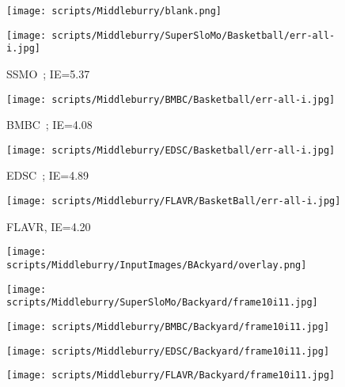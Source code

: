 \documentclass[10pt,twocolumn,letterpaper]{article}
\begin{document}
\begin{table*}[!t]
\begin{figure*}[t]
\begin{center}
     \begin{subfigure}[b]{0.18\textwidth}
        \centering
        \texttt{[image: scripts/Middleburry/blank.png]}
    \end{subfigure}
    \hfill
    \begin{subfigure}[b]{0.18\textwidth}
        \centering
        \texttt{[image: scripts/Middleburry/SuperSloMo/Basketball/err-all-i.jpg]}
        \caption*{SSMO~\cite{jiang2018super}; IE=5.37}
    \end{subfigure}
    \hfill
    \begin{subfigure}[b]{0.18\textwidth}
        \centering
        \texttt{[image: scripts/Middleburry/BMBC/Basketball/err-all-i.jpg]}
        \caption*{BMBC~\cite{park2020bmbc}; IE=4.08}
    \end{subfigure}
    \hfill
    \begin{subfigure}[b]{0.18\textwidth}
        \centering
        \texttt{[image: scripts/Middleburry/EDSC/Basketball/err-all-i.jpg]}
        \caption*{EDSC~\cite{cheng2020multiple}; IE=4.89}
    \end{subfigure}
    \hfill
    \begin{subfigure}[b]{0.18\textwidth}
        \centering
\texttt{[image: scripts/Middleburry/FLAVR/BasketBall/err-all-i.jpg]}
        \caption*{FLAVR, IE=4.20}
    \end{subfigure}
    


    \vspace{1em}
    \begin{subfigure}[b]{0.18\textwidth}
        \centering
        \texttt{[image: scripts/Middleburry/InputImages/BAckyard/overlay.png]}
    \end{subfigure}
    \hfill
    \begin{subfigure}[b]{0.18\textwidth}
        \centering
        \texttt{[image: scripts/Middleburry/SuperSloMo/Backyard/frame10i11.jpg]}
    \end{subfigure}
    \hfill
    \begin{subfigure}[b]{0.18\textwidth}
        \centering
        \texttt{[image: scripts/Middleburry/BMBC/Backyard/frame10i11.jpg]}
    \end{subfigure}
    \hfill
    \begin{subfigure}[b]{0.18\textwidth}
        \centering
        \texttt{[image: scripts/Middleburry/EDSC/Backyard/frame10i11.jpg]}
    \end{subfigure}
    \hfill
    \begin{subfigure}[b]{0.18\textwidth}
        \centering
        \texttt{[image: scripts/Middleburry/FLAVR/Backyard/frame10i11.jpg]}
    \end{subfigure}



\end{center}
\end{figure*}
\end{table*}
\end{document}
